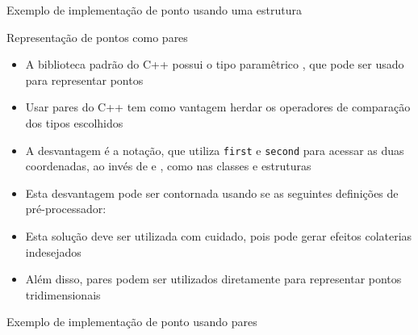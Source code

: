 \begin{frame}[fragile]{Exemplo de implementação de ponto usando uma estrutura}


\end{frame}


\begin{frame}[fragile]{Representação de pontos como pares}

    \begin{itemize}
        \item A biblioteca padrão do C++ possui o tipo paramêtrico , que pode
            ser usado para representar pontos

        \item Usar pares do C++ tem como vantagem herdar os operadores de comparação dos
            tipos escolhidos

        \item A desvantagem é a notação, que utiliza \texttt{first} e \texttt{second} para
            acessar as duas coordenadas, ao invés de  e , como nas classes e
estruturas 

        \item Esta desvantagem pode ser contornada usando se as seguintes definições de 
            pré-processador:


        \item Esta solução deve ser utilizada com cuidado, pois pode gerar efeitos colaterias
            indesejados

        \item Além disso, pares podem ser utilizados diretamente para representar pontos tridimensionais
    \end{itemize}

\end{frame}

\begin{frame}[fragile]{Exemplo de implementação de ponto usando pares}
\end{frame}

